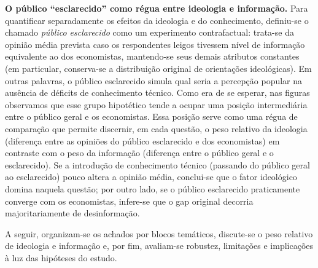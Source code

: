 \textbf{O público “esclarecido” como régua entre ideologia e informação.} Para quantificar separadamente os efeitos da ideologia e do conhecimento, definiu-se o chamado \textit{público esclarecido} como um experimento contrafactual: trata-se da opinião média prevista caso os respondentes leigos tivessem nível de informação equivalente ao dos economistas, mantendo-se seus demais atributos constantes (em particular, conserva-se a distribuição original de orientações ideológicas). Em outras palavras, o público esclarecido simula qual seria a percepção popular na ausência de déficits de conhecimento técnico. Como era de se esperar, nas figuras observamos que esse grupo hipotético tende a ocupar uma posição intermediária entre o público geral e os economistas. Essa posição serve como uma régua de comparação que permite discernir, em cada questão, o peso relativo da ideologia (diferença entre as opiniões do público esclarecido e dos economistas) em contraste com o peso da informação (diferença entre o público geral e o esclarecido). Se a introdução de conhecimento técnico (passando do público geral ao esclarecido) pouco altera a opinião média, conclui-se que o fator ideológico domina naquela questão; por outro lado, se o público esclarecido praticamente converge com os economistas, infere-se que o gap original decorria majoritariamente de desinformação. 

A seguir, organizam-se os achados por blocos temáticos, discute-se o peso relativo de ideologia e informação e, por fim, avaliam-se robustez, limitações e implicações à luz das hipóteses do estudo.

